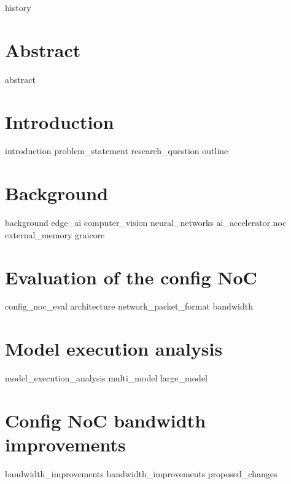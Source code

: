 \documentclass[a4paper,12pt]{report}
\begin{document}
\onehalfspacing

{history}

\chapter*{Abstract}
{abstract}

\tableofcontents

\chapter{Introduction}
{introduction}
{problem_statement}
{research_question}
{outline}

\chapter{Background}
{background}
{edge_ai}
{computer_vision}
{neural_networks}
{ai_accelerator}
{noc}
{external_memory}
{graicore}

\chapter{Evaluation of the config NoC}
{config_noc_eval}
{architecture}
{network_packet_format}
{bandwidth}

\chapter{Model execution analysis}
{model_execution_analysis}
{multi_model}
{large_model}

\chapter{Config NoC bandwidth improvements}
{bandwidth_improvements}
{bandwidth_improvements}
{proposed_changes}
\end{document}
